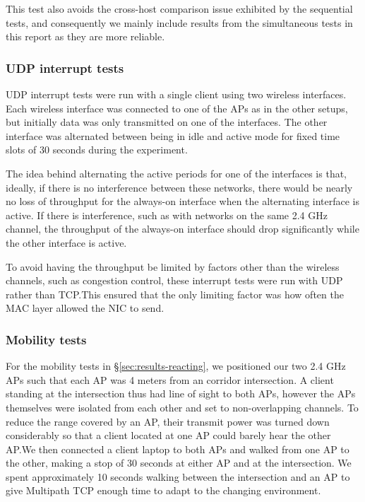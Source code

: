 This test also avoids the cross-host comparison issue exhibited by the
sequential tests, and consequently we mainly include results from the
simultaneous tests in this report as they are more reliable.

\subsubsection{UDP interrupt tests}
\label{sec:met:setups:intudp}
UDP interrupt tests were run with a single client using two
wireless interfaces. Each wireless interface was connected to one of the APs as
in the other setups, but initially data was only transmitted on one of the
interfaces.  The other interface was alternated between being in idle and active
mode for fixed time slots of 30 seconds during the experiment.

The idea behind alternating the active periods for one of the interfaces is
that, ideally, if there is no interference between these networks, there would
be nearly no loss of throughput for the always-on interface when the alternating
interface is active. If there is interference, such as with networks on the same
2.4 GHz channel, the throughput of the always-on interface should drop
significantly while the other interface is active.

To avoid having the throughput be limited by factors other than the wireless
channels, such as congestion control, these interrupt tests were run with UDP rather
than TCP.\@ This ensured that the only limiting factor was how
often the MAC layer allowed the NIC to send.

\subsubsection{Mobility tests}
\label{sec:met:setups:mobility}
For the mobility tests in \S\ref{sec:results-reacting}, we positioned our two
2.4 GHz APs such that each AP was 4 meters from an corridor intersection. 
A client standing at the intersection thus had line of sight to both 
APs, however the APs themselves were isolated from each other and set to non-overlapping 
channels. To reduce the range covered by an AP, their transmit power was 
turned down considerably so that a client 
located at one AP could barely hear the other AP.\@ We then connected a 
client laptop to both APs and walked from one AP to the other, making a stop of 
30 seconds at either AP and at the intersection. We spent approximately 10 
seconds walking between the intersection and an AP to give Multipath TCP
enough time to adapt to the changing environment.

